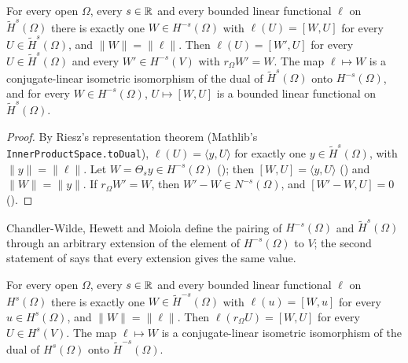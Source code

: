 \begin{theorem}
\label{thm:sobolev-duality}
\leanok
{}
For every open $\Omega$, every $s \in \mathbb{R}$ and every bounded linear functional $\ell$ on
$\tilde H^s(\Omega)$ there is exactly one $W \in H^{-s}(\Omega)$ with $\ell(U) = [W, U]$ for every
$U \in \tilde H^s(\Omega)$, and $\|W\| = \|\ell\|$. Then $\ell(U) = [W', U]$ for every
$U \in \tilde H^s(\Omega)$ and every $W' \in H^{-s}(V)$ with $r_\Omega W' = W$. The map
$\ell \mapsto W$ is a conjugate-linear isometric isomorphism of the dual of $\tilde H^s(\Omega)$
onto $H^{-s}(\Omega)$, and for every $W \in H^{-s}(\Omega)$, $U \mapsto [W, U]$ is a bounded
linear functional on $\tilde H^s(\Omega)$.
\end{theorem}

\begin{proof}
\leanok
By Riesz's representation theorem (Mathlib's \texttt{InnerProductSpace.\allowbreak toDual}),
$\ell(U) = \langle y, U \rangle$ for exactly one $y \in \tilde H^s(\Omega)$, with
$\|y\| = \|\ell\|$. Let $W = \Theta_s y \in H^{-s}(\Omega)$ ();
then $[W, U] = \langle y, U \rangle$ () and $\|W\| = \|y\|$. If
$r_\Omega W' = W$, then $W' - W \in N^{-s}(\Omega)$, and $[W' - W, U] = 0$
().
\end{proof}

Chandler-Wilde, Hewett and Moiola define the pairing of $H^{-s}(\Omega)$ and
$\tilde H^s(\Omega)$ through an arbitrary extension of the element of $H^{-s}(\Omega)$ to $V$;
the second statement of  says that every extension gives the same
value.

\begin{corollary}
\label{cor:sobolev-duality-restriction}
\leanok
{}
For every open $\Omega$, every $s \in \mathbb{R}$ and every bounded linear functional $\ell$ on
$H^s(\Omega)$ there is exactly one $W \in \tilde H^{-s}(\Omega)$ with $\ell(u) = [W, u]$ for every
$u \in H^s(\Omega)$, and $\|W\| = \|\ell\|$. Then $\ell(r_\Omega U) = [W, U]$ for every
$U \in H^s(V)$. The map $\ell \mapsto W$ is a conjugate-linear isometric isomorphism of the dual
of $H^s(\Omega)$ onto $\tilde H^{-s}(\Omega)$.
\end{corollary}

